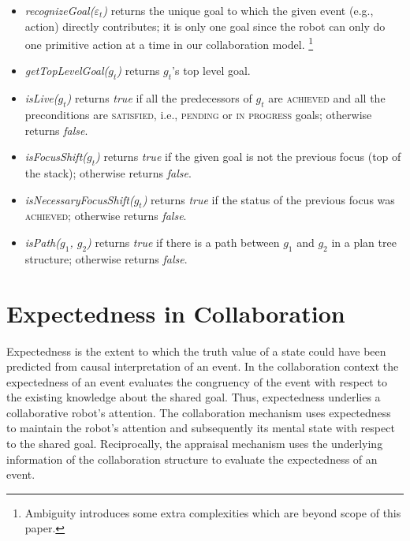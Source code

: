 \documentclass{aamas2016_extendedabstract}
\begin{document}
\vspace*{-3mm}
\begin{itemize}[leftmargin=2pt]
  \setlength\itemsep{0.01mm}
  \item \textit{recognizeGoal($\varepsilon_t$)} returns the unique goal to which
  the given event (e.g., action) directly contributes; it is only one goal since
  the robot can only do one primitive action at a time in our collaboration
  model. \footnote{Ambiguity introduces some extra complexities which are
  beyond scope of this paper.}
  
  \item \textit{getTopLevelGoal($g_t$)} returns $g_t$'s top level goal.
  
  \item \textit{isLive($g_t$)} returns \textit{true} if all the predecessors of
  $g_t$ are \textsc{achieved} and all the preconditions are \textsc{satisfied},
  i.e., \textsc{pending} or \textsc{in progress} goals; otherwise returns \textit{false}.
  
  \item \textit{isFocusShift($g_t$)} returns \textit{true} if the given
  goal is not the previous focus (top of the stack); otherwise returns
  \textit{false}.
  
  \item \textit{isNecessaryFocusShift($g_t$)} returns \textit{true} if the
  status of the previous focus was \textsc{achieved}; otherwise returns
  \textit{false}.
  
  \item \textit{isPath($g_1$, $g_2$)} returns \textit{true} if there is a path
  between $g_1$ and $g_2$ in a plan tree structure; otherwise returns
  \textit{false}.
\end{itemize}

\vspace*{-6mm}
\section{Expectedness in Collaboration}

Expectedness is the extent to which the truth value of a state could have been
predicted from causal interpretation of an event. In the collaboration context
the expectedness of an event evaluates the congruency of the event with respect
to the existing knowledge about the shared goal. Thus, expectedness underlies a
collaborative robot's attention. The collaboration mechanism uses expectedness
to maintain the robot's attention and subsequently its mental state with respect
to the shared goal. Reciprocally, the appraisal mechanism uses the underlying
information of the collaboration structure to evaluate the expectedness of an
event.
\end{document}

